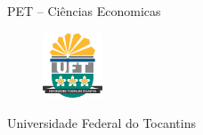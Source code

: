 \clearpage
\newpage
\onecolumn
\pagestyle{empty} %
\vspace*{\fill}
\centering
	\footnotesize{PET -- Ciências Economicas}
	\begin{figure}[H]
		\centering
		\includegraphics[width=50pt]{logos/uft.png}
	\end{figure}
	\footnotesize{Universidade Federal do Tocantins}
